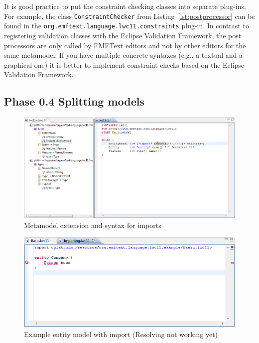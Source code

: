 \documentclass[10pt, pdftex]{llncs}
\begin{document}
It is good practice to put the constraint checking classes into separate
plug-ins. For example, the class \texttt{ConstraintChecker} from 
Listing~\ref{lst:postprocessor} can be found
in the \texttt{org.emftext.language.lwc11.constraints} plug-in. In contrast to 
registering validation classes with the Eclipse Validation Framework, the post
processors are only called by EMFText editors and not by other editors for the
same metamodel. If you have multiple concrete syntaxes (e.g., a textual and a
graphical one) it is better to implement constraint checks based on the Eclipse
Validation Framework.

\subsection{Phase 0.4 Splitting models}
\label{sec:phase-0-4}

\begin{figure}
	\centering
	\includegraphics[width=1.00\textwidth]{figures/imports.png}
	\caption{Metamodel extension and syntax for imports}
	\label{fig:imports}
\end{figure}

\begin{figure}
	\centering
	\includegraphics[width=1.00\textwidth]{figures/importexample1.png}
	\caption{Example entity model with import (Resolving not working yet)}
	\label{fig:importexample1}
\end{figure}
\end{document}
